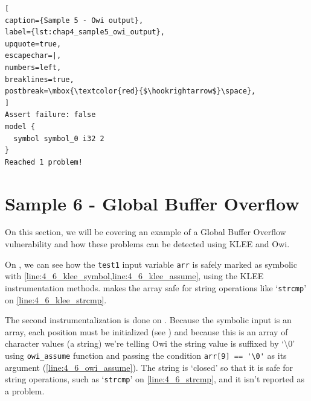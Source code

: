

\begin{lstlisting}[
caption={Sample 5 - Owi output},
label={lst:chap4_sample5_owi_output},
upquote=true,
escapechar=|,
numbers=left,
breaklines=true,
postbreak=\mbox{\textcolor{red}{$\hookrightarrow$}\space},
]
Assert failure: false
model {
  symbol symbol_0 i32 2
}
Reached 1 problem!
\end{lstlisting}

\section{Sample 6 - Global Buffer Overflow}\label{section:sample_6}

On this section, we will be covering an example of a Global Buffer Overflow vulnerability and how these problems can be detected using KLEE and Owi.

On , we can see how the \lstinline$test1$ input variable \lstinline$arr$ is safely marked as symbolic with \cref{line:4_6_klee_symbol,line:4_6_klee_assume}, using the KLEE instrumentation methods.  makes the array safe for string operations like `\lstinline$strcmp$' on \cref{line:4_6_klee_strcmp}.

The second instrumentalization is done on .
Because the symbolic input is an array, each position must be initialized (see ) and because this is an array of character values (a string) we're telling Owi the string value is suffixed by `\textbackslash0' using \lstinline$owi_assume$ function and passing the condition \lstinline[upquote=true]+arr[9] == '\0'+ as its argument (\cref{line:4_6_owi_assume}). The string is `closed' so that it is safe for string operations, such as `\lstinline$strcmp$' on \cref{line:4_6_strcmp}, and it isn't reported as a problem.



